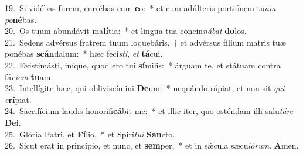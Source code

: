 {19.~}Si vidébas furem, currébas cum \textbf{e}o:~* et cum adúlteris portiónem tu\textit{am} \textit{po}\textbf{né}bas.\\
{20.~}Os tuum abundávit ma\textbf{lí}tia:~* et lingua tua concin\textit{ná}\textit{bat} \textbf{do}los.\\
{21.~}Sedens advérsus fratrem tuum loquebáris,~† et advérsus fílium matris tuæ ponébas \textbf{scán}dalum:~* hæc fecí\textit{sti}, \textit{et} \textbf{tá}cui.\\
{22.~}Existimásti, iníque, quod ero tui \textbf{sí}milis:~* árguam te, et státuam contra fá\textit{ci}\textit{em} \textbf{tu}am.\\
{23.~}Intellígite hæc, qui obliviscímini \textbf{De}um:~* nequándo rápiat, et non sit \textit{qui} \textit{e}\textbf{rí}piat.\\
{24.~}Sacrifícium laudis honorifi\textbf{cá}bit me:~* et illic iter, quo osténdam illi salu\textit{tá}\textit{re} \textbf{De}i.\\
{25.~}Glória Patri, et \textbf{Fí}lio,~* et Spirí\textit{tu}\textit{i} \textbf{San}cto.\\
{26.~}Sicut erat in princípio, et nunc, et \textbf{sem}per,~* et in sǽcula sæcu\textit{ló}\textit{rum}. \textbf{A}men.\\
